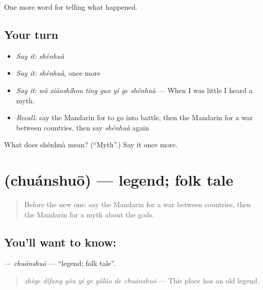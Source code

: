 \begin{grammarlens}[title={What you've built}]
One more word for telling what happened.
\end{grammarlens}

\subsection*{Your turn}
\begin{itemize}
\raggedright
  \item \emph{Say it:} \emph{shénhuà}
  \item \emph{Say it:} \emph{shénhuà}, once more
  \item \emph{Say it:} \emph{wǒ xiǎoshíhou tīng guo yí ge shénhuà} — When I was little I heard a myth.
  \item \emph{Recall:} say the Mandarin for to go into battle, then the Mandarin for a war between countries, then say \emph{shénhuà} again
\end{itemize}

\begin{tcolorbox}[breakable,colback=teal!4,colframe=teal!35!black,title={Before you move on}]
What does shénhuà mean? (\textquotedblleft{}Myth\textquotedblright{}.) Say it once more.
\end{tcolorbox}
\section[\texorpdfstring{\zh{传说} (chuánshuō)}{传说 (chuánshuō)}]{ (chuánshuō) — legend; folk tale}

\label{lesson:ZH-C328-chuanshuo}



\begin{quote}
Before the new one: say the Mandarin for a war between countries, then the Mandarin for a myth about the gods.
\end{quote}

\subsection*{You'll want to know: }
\textbf{} — \emph{chuánshuō} — \textquotedblleft{}legend; folk tale\textquotedblright{}.

\begin{quote}
\emph{zhège dìfang yǒu yí ge gǔlǎo de chuánshuō} — This place has an old legend.
\end{quote}

